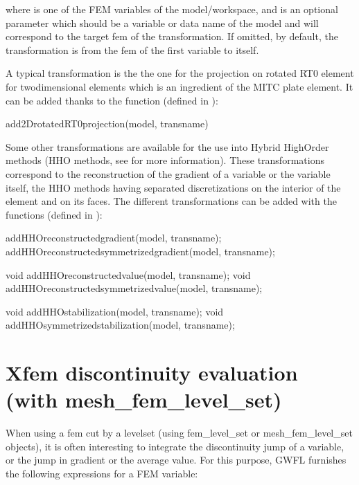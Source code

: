 \documentclass[a4paper,11pt,english]{sphinxmanual}
\begin{document}
where  is one of the FEM variables of the model/workspace, and  is an optional parameter which should be a variable or data name of the model and will correspond to the target fem of the transformation. If omitted, by default, the transformation is from the fem of the first variable to itself.

A typical transformation is the the one for the projection on rotated RT0 element for two\sphinxhyphen{}dimensional elements which is an ingredient of the MITC plate element. It can be added thanks to the function (defined in ):

\begin{sphinxVerbatim}[commandchars=\\\{\}]
add\PYGZus{}2D\PYGZus{}rotated\PYGZus{}RT0\PYGZus{}projection(model, transname)
\end{sphinxVerbatim}

Some other transformations are available for the use into Hybrid High\sphinxhyphen{}Order methods (HHO methods, see {\hyperref[\detokenize{userdoc/hho:ud-hho}]{}} for more information). These transformations correspond to the reconstruction of the gradient of a variable or the variable itself, the HHO methods having separated discretizations on the interior of the element and on its faces. The different transformations can be added with the functions (defined in ):

\begin{sphinxVerbatim}[commandchars=\\\{\}]
add\PYGZus{}HHO\PYGZus{}reconstructed\PYGZus{}gradient(model, transname);
add\PYGZus{}HHO\PYGZus{}reconstructed\PYGZus{}symmetrized\PYGZus{}gradient(model, transname);

void add\PYGZus{}HHO\PYGZus{}reconstructed\PYGZus{}value(model, transname);
void add\PYGZus{}HHO\PYGZus{}reconstructed\PYGZus{}symmetrized\PYGZus{}value(model, transname);

void add\PYGZus{}HHO\PYGZus{}stabilization(model, transname);
void add\PYGZus{}HHO\PYGZus{}symmetrized\PYGZus{}stabilization(model, transname);
\end{sphinxVerbatim}


\section{Xfem discontinuity evaluation (with mesh\_fem\_level\_set)}
\label{\detokenize{userdoc/gasm_high:xfem-discontinuity-evaluation-with-mesh-fem-level-set}}\label{\detokenize{userdoc/gasm_high:ud-gasm-high-xfem}}
When using a fem cut by a level\sphinxhyphen{}set (using fem\_level\_set or mesh\_fem\_level\_set objects), it is often interesting to integrate the discontinuity jump of a variable, or the jump in gradient or the average value. For this purpose, GWFL furnishes the following expressions for  a FEM variable:
\end{document}
